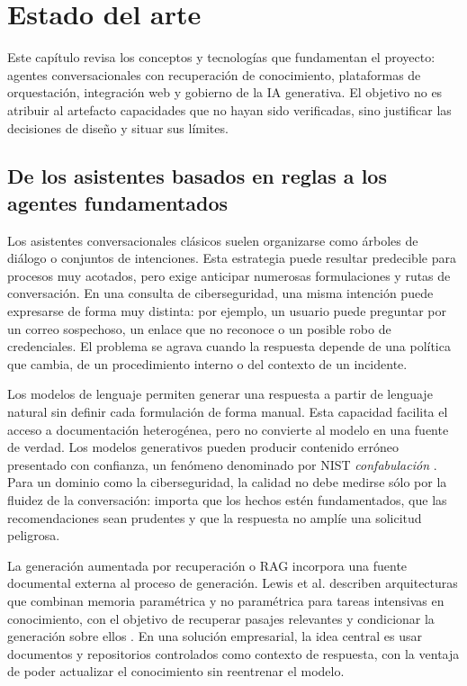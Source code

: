 \documentclass[12pt,twoside,titlepage]{book}
\begin{document}


\chapter{Estado del arte}
\label{chap:estado-arte}

Este capítulo revisa los conceptos y tecnologías que fundamentan el proyecto:
agentes conversacionales con recuperación de conocimiento, plataformas de
orquestación, integración web y gobierno de la IA generativa. El objetivo no es
atribuir al artefacto capacidades que no hayan sido verificadas, sino justificar
las decisiones de diseño y situar sus límites.

\section{De los asistentes basados en reglas a los agentes fundamentados}
\label{sec:evolucion-agentes}

Los asistentes conversacionales clásicos suelen organizarse como árboles de
diálogo o conjuntos de intenciones. Esta estrategia puede resultar predecible
para procesos muy acotados, pero exige anticipar numerosas formulaciones y rutas
de conversación. En una consulta de ciberseguridad, una misma intención puede
expresarse de forma muy distinta: por ejemplo, un usuario puede preguntar por un
correo sospechoso, un enlace que no reconoce o un posible robo de credenciales.
El problema se agrava cuando la respuesta depende de una política que cambia, de
un procedimiento interno o del contexto de un incidente.

Los modelos de lenguaje permiten generar una respuesta a partir de lenguaje
natural sin definir cada formulación de forma manual. Esta capacidad facilita el
acceso a documentación heterogénea, pero no convierte al modelo en una fuente de
verdad. Los modelos generativos pueden producir contenido erróneo presentado con
confianza, un fenómeno denominado por NIST \emph{confabulación}
\cite{nistGenAi2024}. Para un dominio como la ciberseguridad, la calidad no debe
medirse sólo por la fluidez de la conversación: importa que los hechos estén
fundamentados, que las recomendaciones sean prudentes y que la respuesta no
amplíe una solicitud peligrosa.

La generación aumentada por recuperación o RAG incorpora una fuente documental
externa al proceso de generación. Lewis et al. describen arquitecturas que
combinan memoria paramétrica y no paramétrica para tareas intensivas en
conocimiento, con el objetivo de recuperar pasajes relevantes y condicionar la
generación sobre ellos \cite{lewis2020rag}. En una solución empresarial, la idea
central es usar documentos y repositorios controlados como contexto de respuesta,
con la ventaja de poder actualizar el conocimiento sin reentrenar el modelo.
\end{document}

